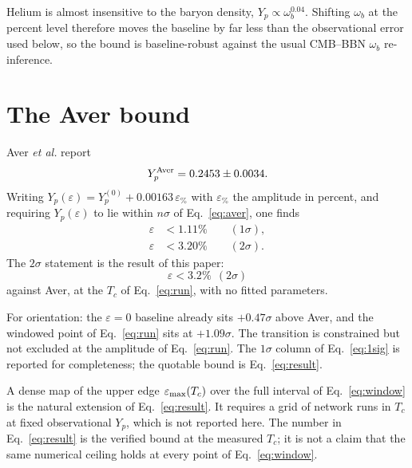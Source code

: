 \documentclass[aps,prd,twocolumn,superscriptaddress,nofootinbib,10pt]{revtex4-2}
\begin{document}
Helium is almost insensitive to the baryon density, $Y_p \propto \omega_b^{0.04}$. Shifting
$\omega_b$ at the percent level therefore moves the baseline by far less than the observational
error used below, so the bound is baseline-robust against the usual CMB--BBN $\omega_b$
re-inference.

\section{The Aver bound}\label{sec:bound}

Aver \emph{et al.} report~\cite{Aver2021}
%
\begin{equation}
  Y_p^{\rm Aver} = 0.2453 \pm 0.0034.
  \label{eq:aver}
\end{equation}
%
Writing $Y_p(\varepsilon) = Y_p^{(0)} + 0.00163\,\varepsilon_{\%}$ with $\varepsilon_{\%}$ the
amplitude in percent, and requiring $Y_p(\varepsilon)$ to lie within $n\sigma$ of
Eq.~\eqref{eq:aver}, one finds
%
\begin{align}
  \varepsilon &< 1.11\% \qquad (1\sigma), \label{eq:1sig}\\
  \varepsilon &< 3.20\% \qquad (2\sigma). \label{eq:2sig}
\end{align}
%
The $2\sigma$ statement is the result of this paper:
%
\begin{equation}
  \boxed{\ \varepsilon < 3.2\%\ \ (2\sigma)\ }
  \label{eq:result}
\end{equation}
%
against Aver, at the $T_c$ of Eq.~\eqref{eq:run}, with no fitted parameters.

For orientation: the $\varepsilon=0$ baseline already sits $+0.47\sigma$ above Aver, and the
windowed point of Eq.~\eqref{eq:run} sits at $+1.09\sigma$. The transition is constrained but not
excluded at the amplitude of Eq.~\eqref{eq:run}. The $1\sigma$ column of Eq.~\eqref{eq:1sig} is
reported for completeness; the quotable bound is Eq.~\eqref{eq:result}.

A dense map of the upper edge $\varepsilon_{\rm max}(T_c)$ over the full interval of
Eq.~\eqref{eq:window} is the natural extension of Eq.~\eqref{eq:result}. It requires a grid of
network runs in $T_c$ at fixed observational $Y_p$, which is not reported here. The number in
Eq.~\eqref{eq:result} is the verified bound at the measured $T_c$; it is not a claim that the
same numerical ceiling holds at every point of Eq.~\eqref{eq:window}.

\end{document}
